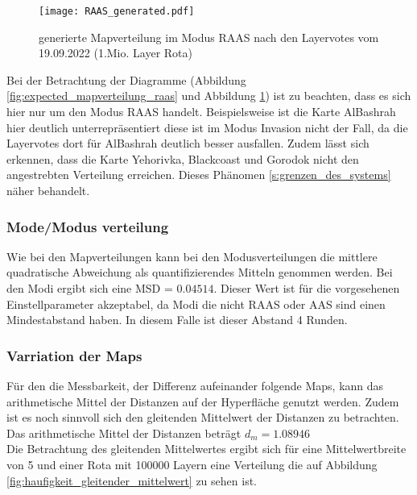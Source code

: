             \begin{figure}[htbp]
                \centering
                \texttt{[image: RAAS\_generated.pdf]}
                \caption{generierte Mapverteilung im Modus RAAS nach den Layervotes vom 19.09.2022 (1.Mio. Layer Rota)}
                \label{fig:generated_mapverteilung_raas}
            \end{figure}

            Bei der Betrachtung der Diagramme 
            (Abbildung \ref{fig:expected_mapverteilung_raas} und Abbildung \ref{fig:generated_mapverteilung_raas}) 
            ist zu beachten, dass es sich hier nur um den Modus RAAS handelt.
            Beispielsweise ist die Karte AlBashrah hier deutlich unterrepräsentiert diese ist im Modus Invasion
            nicht der Fall, da die Layervotes dort für AlBashrah deutlich besser ausfallen.
            Zudem lässt sich erkennen, dass die Karte Yehorivka, Blackcoast und Gorodok nicht den angestrebten
            Verteilung erreichen. Dieses Phänomen \ref{s:grenzen_des_systems} näher behandelt.

        \subsubsection{Mode/Modus verteilung}
            Wie bei den Mapverteilungen kann bei den Modusverteilungen die mittlere quadratische Abweichung als
            quantifizierendes Mitteln genommen werden. Bei den Modi ergibt sich eine MSD = $0.04514$.
            Dieser Wert ist für die vorgesehenen Einstellparameter akzeptabel, da Modi die nicht RAAS oder AAS sind
            einen Mindestabstand haben. In diesem Falle ist dieser Abstand 4 Runden.
        \subsubsection{Varriation der Maps}
            Für den die Messbarkeit, der Differenz aufeinander folgende Maps, kann das arithmetische Mittel der Distanzen
            auf der Hyperfläche genutzt werden. Zudem ist es noch sinnvoll sich den gleitenden Mittelwert der Distanzen
            zu betrachten.\\
            Das arithmetische Mittel der Distanzen beträgt $d_m = 1.08946$\\
            Die Betrachtung des gleitenden Mittelwertes ergibt sich für eine Mittelwertbreite von 5 und einer Rota mit 100000 Layern
            eine Verteilung die auf Abbildung \ref{fig:haufigkeit_gleitender_mittelwert} zu sehen ist.
            
